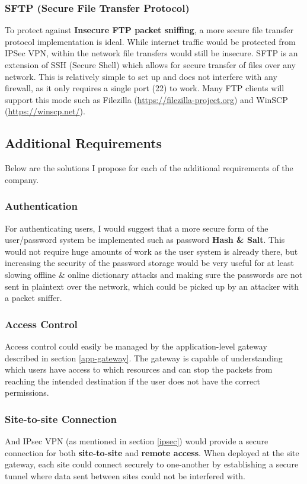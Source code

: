 \documentclass[11pt]{article}
\begin{document}
        \subsubsection{SFTP (Secure File Transfer Protocol)}
          To protect against \textbf{Insecure FTP packet sniffing}, a more secure file transfer protocol implementation is ideal. While internet traffic would be protected from IPSec VPN, within the network file transfers would still be insecure. SFTP is an extension of SSH (Secure Shell) which allows for secure transfer of files over any network. This is relatively simple to set up and does not interfere with any firewall, as it only requires a single port (22) to work. Many FTP clients will support this mode such as Filezilla (\url{https://filezilla-project.org}) and WinSCP (\url{https://winscp.net/}).

      \subsection{Additional Requirements}
        Below are the solutions I propose for each of the additional requirements of the company.

        \subsubsection{Authentication} \label{auth}
          For authenticating users, I would suggest that a more secure form of the user/password system be implemented such as password \textbf{Hash \& Salt}. This would not require huge amounts of work as the user system is already there, but increasing the security of the password storage would be very useful for at least slowing offline \& online dictionary attacks and making sure the passwords are not sent in plaintext over the network, which could be picked up by an attacker with a packet sniffer.

        \subsubsection{Access Control}
          Access control could easily be managed by the application-level gateway described in section \ref{app-gateway}. The gateway is capable of understanding which users have access to which resources and can stop the packets from reaching the intended destination if the user does not have the correct permissions.

        \subsubsection{Site-to-site Connection} \label{ipsec2}
          And IPsec VPN (as mentioned in section \ref{ipsec}) would provide a secure connection for both \textbf{site-to-site} and \textbf{remote access}. When deployed at the site gateway, each site could connect securely to one-another by establishing a secure tunnel where data sent between sites could not be interfered with.
\end{document}
